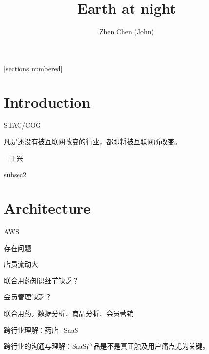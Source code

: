 \documentclass[10pt]{ctexbeamer}
\title{Earth at night}
\date{}
\author{Zhen Chen (John)}
\institute{A2 Inc}
\begin{document}
\maketitle

\begin{frame}{}
  [sections numbered]
  \tableofcontents[hideallsubsections]
\end{frame}

\section{Introduction}

\begin{frame}[fragile]{STAC/COG}

  凡是还没有被互联网改变的行业，都即将被互联网所改变。

  -- 王兴 \citep{美团王兴的思维模32:online}
\end{frame}

\begin{frame}{subsec2}
   
\end{frame}

\section{Architecture}

\begin{frame}[fragile]{AWS}

  \citep{2021年中国医79:online}

\end{frame}


\begin{frame}{存在问题}
  
  店员流动大

  联合用药知识细节缺乏？
  
  会员管理缺乏？

  联合用药，数据分析、商品分析、会员营销
  
  跨行业理解：药店+SaaS

  跨行业的沟通与理解：SaaS产品是不是真正触及用户痛点尤为关键。

\end{frame}
\end{document}
